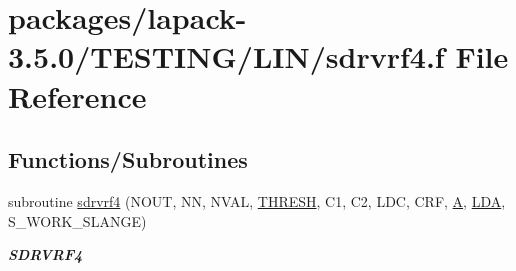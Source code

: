 \hypertarget{sdrvrf4_8f}{}\section{packages/lapack-\/3.5.0/\+T\+E\+S\+T\+I\+N\+G/\+L\+I\+N/sdrvrf4.f File Reference}
\label{sdrvrf4_8f}
\subsection*{Functions/\+Subroutines}
\begin{DoxyCompactItemize}
\item 
subroutine \hyperlink{group__single__lin_gaa7f1dac33429622a8b76027406f2e49d}{sdrvrf4} (N\+O\+U\+T, N\+N, N\+V\+A\+L, \hyperlink{zlaqgs_8c_a0656018abfc9fa2821827415f5d5ea57}{T\+H\+R\+E\+S\+H}, C1, C2, L\+D\+C, C\+R\+F, \hyperlink{classA}{A}, \hyperlink{example__user_8c_ae946da542ce0db94dced19b2ecefd1aa}{L\+D\+A}, S\+\_\+\+W\+O\+R\+K\+\_\+\+S\+L\+A\+N\+G\+E)
\begin{DoxyCompactList}\small\item\em {\bfseries S\+D\+R\+V\+R\+F4} \end{DoxyCompactList}\end{DoxyCompactItemize}
